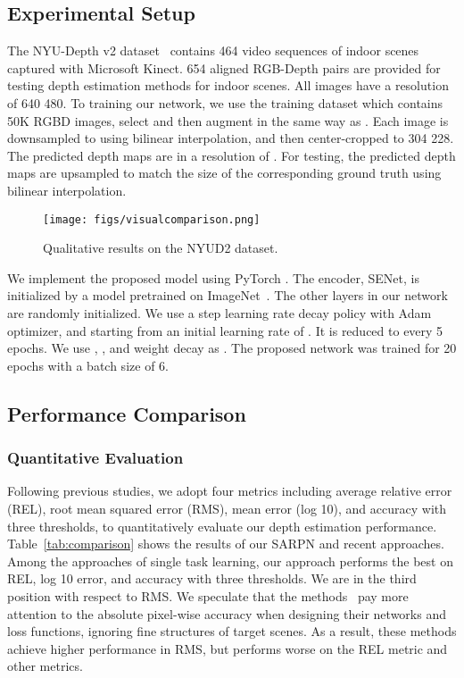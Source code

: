 \documentclass{article}
\begin{document}
\subsection{Experimental Setup}
The NYU-Depth v2 dataset~\cite{silberman2012indoor} contains 464 video sequences of indoor scenes captured with Microsoft Kinect. 
654 aligned RGB-Depth pairs are provided for testing depth estimation methods for indoor scenes. 
All images have a resolution of 640  480. 
To training our network, we use the training dataset which contains 50K RGBD images, select and then augment in the same way as \cite{hu2019revisiting}. 
Each image is downsampled to  using bilinear interpolation, and then center-cropped to 304  228.
The predicted depth maps are in a resolution of .
For testing, the predicted depth maps are upsampled to match the size of the corresponding ground truth using bilinear interpolation.
\begin{figure*}  
	\centering 
	\texttt{[image: figs/visualcomparison.png]}
	\caption{Qualitative results on the NYUD2 dataset.}
	\label{fig:visual-comp}
\end{figure*}

We implement the proposed model using PyTorch \cite{paszke2017automatic}.
The encoder, SENet, is initialized by a model pretrained on ImageNet~\cite{deng2009imagenet}. 
The other layers in our network are randomly initialized. 
We use a step learning rate decay policy with Adam optimizer, and starting from an initial learning rate of . It is reduced to  every 5 epochs. 
We use , , and weight decay as . 
The proposed network was trained for 20 epochs with a batch size of 6.

\subsection{Performance Comparison} 
\subsubsection{Quantitative Evaluation} 
Following previous studies, we adopt four metrics including average relative error (REL), root mean squared error (RMS), mean  error (log 10), and accuracy with three thresholds, to quantitatively evaluate our depth estimation performance.
Table~\ref{tab:comparison} shows the results of our SARPN and recent approaches. 
Among the approaches of single task learning, our approach performs the best on REL, log 10 error, and accuracy with three thresholds.
We are in the third position with respect to RMS.
We speculate that the methods~\cite{fu2018deep,jiao2018look} pay more attention to the absolute pixel-wise accuracy when designing their networks and loss functions, ignoring fine structures of target scenes. 
As a result, these methods achieve higher performance in RMS, but performs worse on the REL metric and other metrics. 
\end{document}
